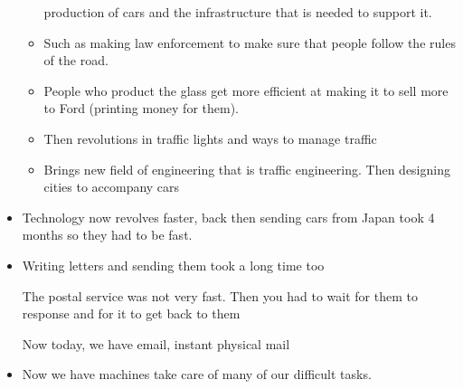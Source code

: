 \documentclass{article}
\begin{document}
\begin{itemize}
\begin{itemize}
        production of cars and the infrastructure
        that is needed to support it.
      \item Such as making law enforcement
        to make sure that people follow the rules
        of the road.
      \item People who product the glass
        get more efficient at making it to sell
        more to Ford (printing money for them).
      \item Then revolutions in traffic lights and
        ways to manage traffic
      \item Brings new field of engineering that
        is traffic engineering. Then designing
        cities to accompany cars
    \end{itemize}
  \item Technology now revolves faster, back then
    sending cars from Japan took 4 months so they had to be
    fast.
  \item Writing letters and sending them took a long time too

    The postal service was not very fast. Then
    you had to wait for them to response and for it
    to get back to them

    Now today, we have email, instant physical mail
  \item Now we have machines take care of many of our difficult
    tasks.
\end{itemize}
\end{document}
